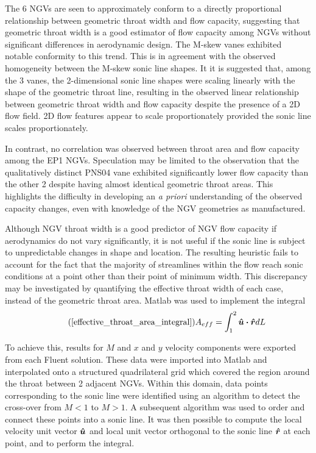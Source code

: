 \documentclass[a4paper, 11pt, oneside]{report}
\begin{document}
The 6 NGVs are seen to approximately conform to a directly proportional relationship between geometric throat width and flow capacity, suggesting that geometric throat width is a good estimator of flow capacity among NGVs without significant differences in aerodynamic design. The M-skew vanes exhibited notable conformity to this trend. This is in agreement with the observed homogeneity between the M-skew sonic line shapes. It it is suggested that, among the 3 vanes, the 2-dimensional sonic line shapes were scaling linearly with the shape of the geometric throat line, resulting in the observed linear relationship between geometric throat width and flow capacity despite the presence of a 2D flow field. 2D flow features appear to scale proportionately provided the sonic line scales proportionately.

In contrast, no correlation was observed between throat area and flow capacity among the EP1 NGVs. Speculation may be limited to the observation that the qualitatively distinct PNS04 vane exhibited significantly lower flow capacity than the other 2 despite having almost identical geometric throat areas. This highlights the difficulty in developing an \textit{a priori} understanding of the observed capacity changes, even with knowledge of the NGV geometries as manufactured.

Although NGV throat width is a good predictor of NGV flow capacity if aerodynamics do not vary significantly, it is not useful if the sonic line is subject to unpredictable changes in shape and location. The resulting heuristic fails to account for the fact that the majority of streamlines within the flow reach sonic conditions at a point other than their point of minimum width. This discrepancy may be investigated by quantifying the effective throat width of each case, instead of the geometric throat area. Matlab was used to implement the integral
\begin{equation}\tag{\ref{effective_throat_area_integral}}
	A_{eff} = 
	\int_{1}^2 \vu*{u} \vdot \vu*{r} dL
\end{equation}

To achieve this, results for $M$ and $x$ and $y$ velocity components were exported from each Fluent solution. These data were imported into Matlab and interpolated onto a structured quadrilateral grid which covered the region around the throat between 2 adjacent NGVs. Within this domain, data points corresponding to the sonic line were identified using an algorithm to detect the cross-over from $M<1$ to $M>1$. A subsequent algorithm was used to order and connect these points into a sonic line. It was then possible to compute the local velocity unit vector $\vu*{u}$ and local unit vector orthogonal to the sonic line $\vu*{r}$ at each point, and to perform the integral. 
\end{document}
